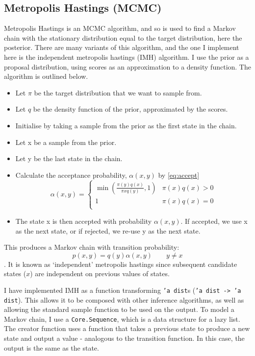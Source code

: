 \subsection{Metropolis Hastings (MCMC)} \label{sec:mh}
Metropolis Hastings is an MCMC algorithm, and so is used to find a Markov chain with the stationary distribution equal to the target distribution, here the posterior. There are many variants of this algorithm, and the one I implement here is the independent metropolis hastings (IMH) algorithm. I use the prior as a proposal distribution, using scores as an approximation to a density function. The algorithm is outlined below.
\begin{itemize}
	\item Let $\pi$ be the target distribution that we want to sample from.
	\item Let $q$ be the density function of the prior, approximated by the scores.
	\item Initialise by taking a sample from the prior as the first state in the chain.
	\item Let x be a sample from the prior.
	\item Let y be the last state in the chain.
	\item Calculate the acceptance probability, $\alpha(x,y)$ by \eqref{eq:accept}
	      \begin{equation}
	      	\label{eq:accept}
	      	\alpha(x,y) = 
	      	\begin{cases}
	      		\min{\left( \frac{\pi(y)q(x)}{\pi{x}q(y)},1 \right) } & \pi(x)q(x) > 0 \\
	      		1                                                     & \pi(x)q(x) = 0 \\
	      	\end{cases}
	      \end{equation}	      	      	      	      
	\item The state x is then accepted with probability $\alpha(x,y)$. If accepted, we use x as the next state, or if rejected, we re-use y as the next state. 
\end{itemize}
	
This produces a Markov chain with transition probability: \[p(x, y) = q(y)\alpha(x, y) \quad\quad y\neq x\].
It is known as `independent' metropolis hastings since subsequent candidate states ($x$) are independent on previous values of states.
	
I have implemented IMH as a function transforming \texttt{'a dist}s (\texttt{'a dist -> 'a dist}). This allows it to be composed with other inference algorithms, as well as allowing the standard sample function to be used on the output. To model a Markov chain, I use a \texttt{Core.Sequence}, which is a data structure for a lazy list. The creator function uses a function that takes a previous state to produce a new state and output a value - analogous to the transition function. In this case, the output is the same as the state.
	
